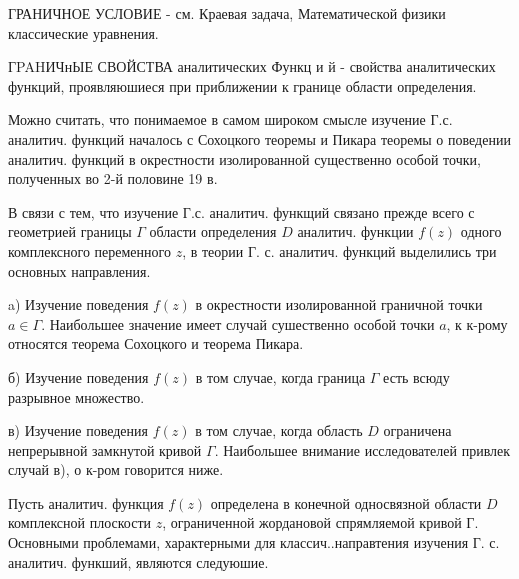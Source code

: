 \documentclass[10pt]{article}
\begin{document}
ГРАНИЧНОЕ УСЛОВИЕ - см. Краевая задача, Математической физики классические уравнения.



ГPAHИЧнЫЕ СВОЙСТВА аналитических Функц и й - свойства аналитических функций, проявляюшиеся при приближении к границе области определения.



Можно считать, что понимаемое в самом широком смысле изучение Г.с. аналитич. функций началось с Сохоцкого теоремы и Пикара теоремы о поведении аналитич. функций в окрестности изолированной существенно особой точки, полученных во 2-й половине 19 в.



В связи с тем, что изучение Г.с. аналитич. функщий связано прежде всего с геометрией границы $\Gamma$ области определения $D$ аналитич. функции $f(z)$ одного комплексного переменного $z$, в теории Г. с. аналитич. функций выделились три основных направления.



a) Изучение поведения $f(z)$ в окрестности изолированной граничной точки $a \in \Gamma$. Наибольшее значение имеет случай сушественно особой точки $a$, к к-рому относятся теорема Сохоцкого и теорема Пикара.



б) Изучение поведения $f(z)$ в том случае, когда граница $\Gamma$ есть всюду разрывное множество.



в) Изучение поведения $f(z)$ в том случае, когда область $D$ ограничена непрерывной замкнутой кривой $\Gamma$. Наибольшее внимание исследователей привлек случай в), о к-ром говорится ниже.



Пусть аналитич. функция $f(z)$ определена в конечной односвязной области $D$ комплексной плоскости $z$, ограниченной жордановой спрямляемой кривой Г. Основными проблемами, характерными для классич..направтения изучения Г. с. аналитич. функший, являются следуюшие.
\end{document}
